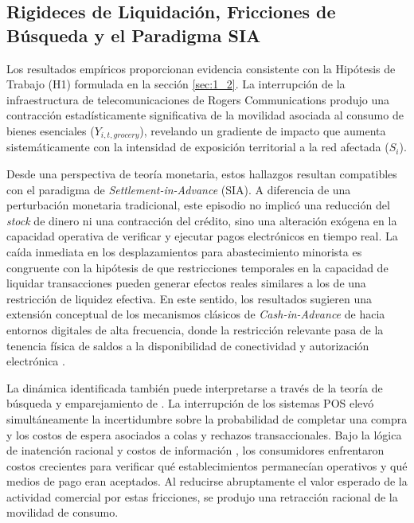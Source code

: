 \subsection{Rigideces de Liquidaci\'on, Fricciones de B\'usqueda y el Paradigma SIA}\label{sec:7_3}

Los resultados emp\'iricos proporcionan evidencia consistente con la Hip\'otesis de Trabajo (H1) formulada en la secci\'on \ref{sec:1_2}. La interrupci\'on de la infraestructura de telecomunicaciones de Rogers Communications produjo una contracci\'on estad\'isticamente significativa de la movilidad asociada al consumo de bienes esenciales ($Y_{i,t,grocery}$), revelando un gradiente de impacto que aumenta sistem\'aticamente con la intensidad de exposici\'on territorial a la red afectada ($S_i$). 

Desde una perspectiva de teor\'ia monetaria, estos hallazgos resultan compatibles con el paradigma de \textit{Settlement-in-Advance} (SIA). A diferencia de una perturbaci\'on monetaria tradicional, este episodio no implic\'o una reducci\'on del \textit{stock} de dinero ni una contracci\'on del cr\'edito, sino una alteraci\'on ex\'ogena en la capacidad operativa de verificar y ejecutar pagos electr\'onicos en tiempo real. La ca\'ida inmediata en los desplazamientos para abastecimiento minorista es congruente con la hip\'otesis de que restricciones temporales en la capacidad de liquidar transacciones pueden generar efectos reales similares a los de una restricci\'on de liquidez efectiva. En este sentido, los resultados sugieren una extensi\'on conceptual de los mecanismos cl\'asicos de \textit{Cash-in-Advance} de \citep{lucas1987money} hacia entornos digitales de alta frecuencia, donde la restricci\'on relevante pasa de la tenencia f\'isica de saldos a la disponibilidad de conectividad y autorizaci\'on electr\'onica \citep{kahn2009pay}.

La din\'amica identificada tambi\'en puede interpretarse a trav\'es de la teor\'ia de b\'usqueda y emparejamiento de \citep{diamond1982aggregate}. La interrupci\'on de los sistemas POS elev\'o simult\'aneamente la incertidumbre sobre la probabilidad de completar una compra y los costos de espera asociados a colas y rechazos transaccionales. Bajo la l\'ogica de inatenci\'on racional y costos de informaci\'on \citep{simon1959theories, sims2003implications}, los consumidores enfrentaron costos crecientes para verificar qu\'e establecimientos permanec\'ian operativos y qu\'e medios de pago eran aceptados. Al reducirse abruptamente el valor esperado de la actividad comercial por estas fricciones, se produjo una retracci\'on racional de la movilidad de consumo.

